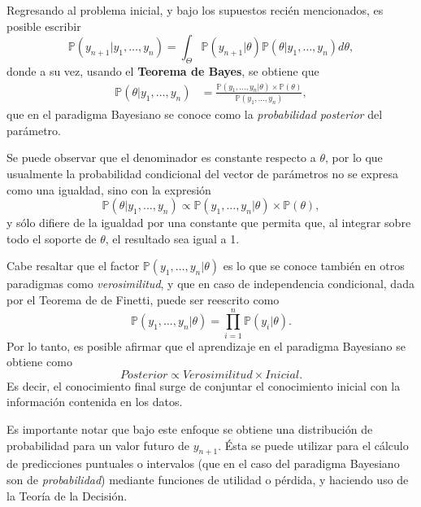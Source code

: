 Regresando al problema inicial, y bajo los supuestos reci\'en mencionados, es posible escribir
\begin{equation*}
    \mathbb{P}(y_{n+1} | y_1,\ldots,y_n) =
    \int_{\Theta} 
    \mathbb{P}(y_{n+1}|\theta) \mathbb{P}(\theta|y_1,\ldots,y_n)d\theta,
\end{equation*}
donde a su vez, usando el \textbf{Teorema de Bayes}, se obtiene que
\begin{equation*}
\begin{aligned}
    \mathbb{P}(\theta|y_1,\ldots,y_n) &=
    \frac{\mathbb{P}(y_1,\ldots,y_n|\theta)\times\mathbb{P}(\theta)}
    {\mathbb{P}(y_1,\ldots,y_n)},
\end{aligned}
\end{equation*}
que en el paradigma Bayesiano se conoce como la \textit{probabilidad posterior} del par\'ametro. 

Se puede observar que el denominador es constante respecto a $\theta$, por lo que usualmente la probabilidad condicional del vector de par\'ametros no se expresa como una igualdad, sino con la expresi\'on
\begin{equation*}
    \mathbb{P}(\theta|y_1,\ldots,y_n) 
    \propto 
    \mathbb{P}(y_1,\ldots,y_n|\theta) \times \mathbb{P}(\theta),
\end{equation*}
y s\'olo difiere de la igualdad por una constante que permita que, al integrar sobre todo el soporte de $\theta$, el resultado sea igual a 1.

Cabe resaltar que el factor $\mathbb{P}(y_1,\ldots,y_n|\theta)$ es lo que se conoce tambi\'en en otros paradigmas como \textit{verosimilitud}, y que en caso de independencia condicional, dada por el Teorema de de Finetti, puede ser reescrito como
\begin{equation*}
    \mathbb{P}(y_1,\ldots,y_n|\theta)  = \prod_{i=1}^n \mathbb{P}(y_i|\theta).
\end{equation*}
Por lo tanto, es posible afirmar que el aprendizaje en el paradigma Bayesiano se obtiene como
\begin{equation*}
    Posterior \propto Verosimilitud \times Inicial.
\end{equation*}
Es decir, el conocimiento final surge de conjuntar el conocimiento inicial con la informaci\'on contenida en los datos.

Es importante notar que bajo este enfoque se obtiene una distribuci\'on de probabilidad para un valor futuro de $y_{n+1}$. \'Esta se puede utilizar para el c\'alculo de predicciones puntuales o intervalos (que en el caso del paradigma Bayesiano son de \textit{probabilidad}) mediante funciones de utilidad o p\'erdida, y haciendo uso de la Teor\'ia de la Decisi\'on.


